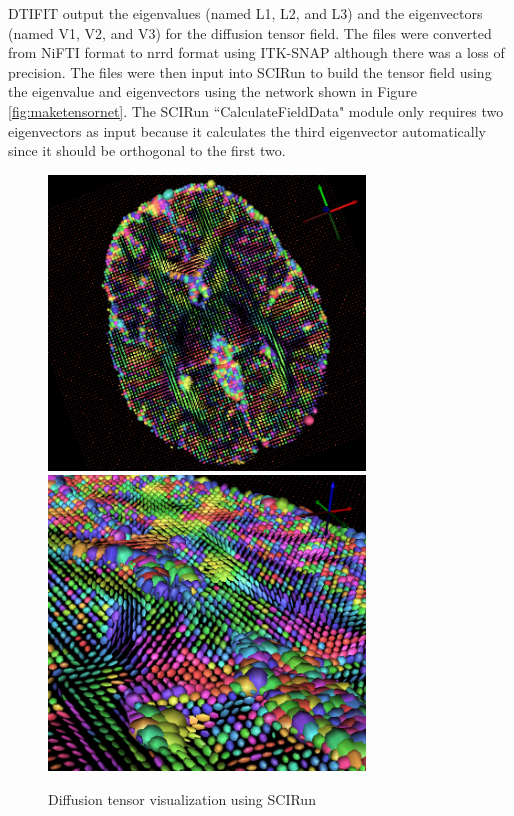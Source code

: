 DTIFIT output the eigenvalues (named L1, L2, and L3) and the eigenvectors (named V1, V2, and V3) for the diffusion tensor field. The files were converted from NiFTI format to nrrd format using ITK-SNAP \cite{ref:itksnap} although there was a loss of precision. The files were then input into SCIRun to build the tensor field using the eigenvalue and eigenvectors using the network shown in Figure \ref{fig:maketensornet}. The SCIRun ``CalculateFieldData" module only requires two eigenvectors as input because it calculates the third eigenvector automatically since it should be orthogonal to the first two. 

\begin{figure}[p]
\begin{center}
\includegraphics[width=0.75\textwidth]{Figures/DTI_1.png}
\includegraphics[width=0.75\textwidth]{Figures/DTI_2.png}
\caption{Diffusion tensor visualization using SCIRun}
\label{fig:tensorvis}
\end{center}
\end{figure}

